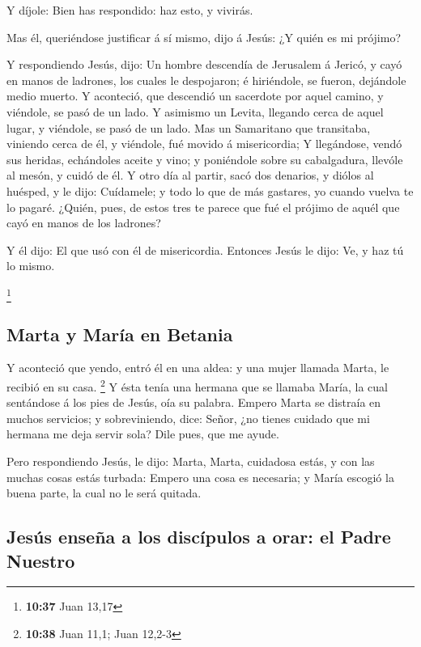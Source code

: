  Y díjole: Bien has respondido: haz esto, y vivirás.

 Mas él, queriéndose justificar á sí mismo, dijo á Jesús:
¿Y quién es mi prójimo?

 Y respondiendo Jesús, dijo: Un hombre descendía de
Jerusalem á Jericó, y cayó en manos de ladrones, los cuales le
despojaron; é hiriéndole, se fueron, dejándole medio muerto.
 Y aconteció, que descendió un sacerdote por aquel
camino, y viéndole, se pasó de un lado.  Y asimismo un
Levita, llegando cerca de aquel lugar, y viéndole, se pasó de un lado.
 Mas un Samaritano que transitaba, viniendo cerca de él,
y viéndole, fué movido á misericordia;  Y llegándose,
vendó sus heridas, echándoles aceite y vino; y poniéndole sobre su
cabalgadura, llevóle al mesón, y cuidó de él.  Y otro día
al partir, sacó dos denarios, y diólos al huésped, y le dijo: Cuídamele;
y todo lo que de más gastares, yo cuando vuelva te lo pagaré.
 ¿Quién, pues, de estos tres te parece que fué el prójimo
de aquél que cayó en manos de los ladrones?

 Y él dijo: El que usó con él de misericordia. Entonces
Jesús le dijo: Ve, y haz tú lo mismo.

\footnote{\textbf{10:37} Juan 13,17}

\hypertarget{marta-y-maruxeda-en-betania}{%
\subsection{Marta y María en
Betania}\label{marta-y-maruxeda-en-betania}}

 Y aconteció que yendo, entró él en una aldea: y una
mujer llamada Marta, le recibió en su casa. \footnote{\textbf{10:38}
  Juan 11,1; Juan 12,2-3}  Y ésta tenía una hermana que
se llamaba María, la cual sentándose á los pies de Jesús, oía su
palabra.  Empero Marta se distraía en muchos servicios; y
sobreviniendo, dice: Señor, ¿no tienes cuidado que mi hermana me deja
servir sola? Dile pues, que me ayude.

 Pero respondiendo Jesús, le dijo: Marta, Marta,
cuidadosa estás, y con las muchas cosas estás turbada: 
Empero una cosa es necesaria; y María escogió la buena parte, la cual no
le será quitada.

\hypertarget{jesuxfas-enseuxf1a-a-los-discuxedpulos-a-orar-el-padre-nuestro}{%
\subsection{Jesús enseña a los discípulos a orar: el Padre
Nuestro}\label{jesuxfas-enseuxf1a-a-los-discuxedpulos-a-orar-el-padre-nuestro}}

